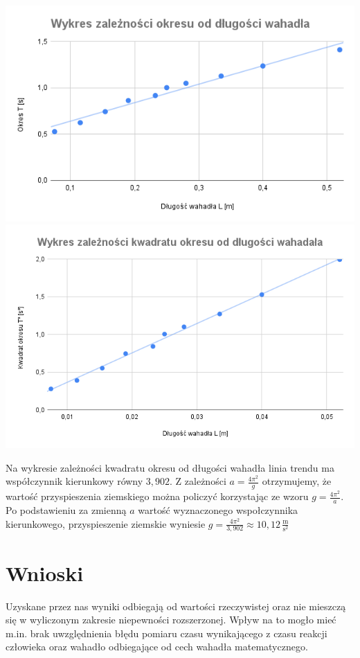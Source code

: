 \documentclass[a4paper,11pt]{article}
\begin{document}
\begin{center}
\includegraphics[scale=0.55]{wyk1.png}
\includegraphics[scale=0.5]{wyk2.png}
\end{center}
Na wykresie zależności kwadratu okresu od długości wahadła linia trendu ma współczynnik kierunkowy równy $3{,}902$. Z zależności $a = \frac{4\pi^2}{g}$ otrzymujemy, że wartość przyspieszenia ziemskiego można policzyć korzystając ze wzoru $g = \frac{4\pi^2}{a}$. Po podstawieniu za zmienną $a$ wartość wyznaczonego wspołczynnika kierunkowego, przyspieszenie ziemskie wyniesie $g = \frac{4\pi^2}{3{,}902} \approx 10{,12}\, \frac{\textrm{m}}{\textrm{s}^2}$

\section{Wnioski}

Uzyskane przez nas wyniki odbiegają od wartości rzeczywistej oraz nie mieszczą się w wyliczonym zakresie niepewności rozszerzonej. Wpływ na to mogło mieć m.in. brak uwzględnienia błędu pomiaru czasu wynikającego z czasu reakcji człowieka oraz wahadło odbiegające od cech wahadła matematycznego.
\end{document}
